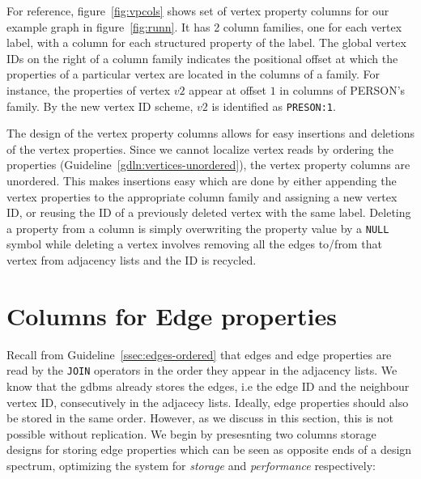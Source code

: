 For reference, figure~\ref{fig:vpcols} shows set of vertex property columns for our example graph in figure~\ref{fig:runn}. It has 2 column families, one for each vertex label, with a column for each structured property of the label. The global vertex IDs on the right of a column family indicates the positional offset at which the properties of a particular vertex are located in the columns of a family. For instance, the properties of vertex $v2$ appear at offset $1$ in columns of PERSON's family. By the new vertex ID scheme, $v2$ is identified as \texttt{PRESON:1}. 


The design of the vertex property columns allows for easy insertions and deletions of the vertex properties. Since we cannot localize vertex reads by ordering the properties (Guideline~\ref{gdln:vertices-unordered}), the vertex property columns are unordered. This makes insertions easy which are done by either appending the vertex properties to the appropriate column family and assigning a new vertex ID, or reusing the ID of a previously deleted vertex with the same label. Deleting a property from a column is simply overwriting the property value by a \texttt{NULL} symbol while deleting a vertex involves removing all the edges to/from that vertex from adjacency lists and the ID is recycled. 

\section{Columns for Edge properties}
\label{sec:edge-property-columns}

Recall from Guideline~\ref{ssec:edges-ordered} that edges and edge properties  are read by the \texttt{JOIN} operators in the order they appear in the adjacency lists. We know that the \gls{gdbms} already stores the edges, i.e the edge ID and the neighbour vertex ID, consecutively in the adjacecy lists. Ideally, edge properties should also be stored in the same order. However, as we discuss in this section, this is not possible without replication. We begin by presesnting two columns storage designs for storing edge properties which can be seen as opposite ends of a design spectrum, optimizing the system for \emph{storage} and \emph{performance} respectively:

